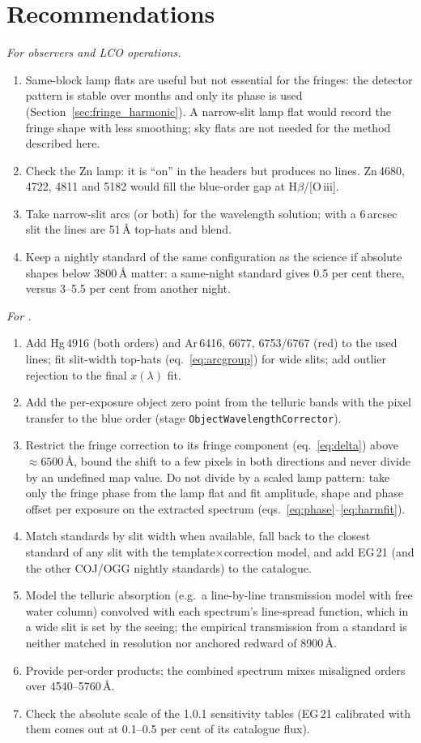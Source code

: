 \section{Recommendations}
\label{sec:recommendations}

\textit{For observers and LCO operations.}
\begin{enumerate}
\item Same-block lamp flats are useful but not essential for the fringes: the detector pattern is stable over months
and only its phase is used (Section~\ref{sec:fringe_harmonic}). A narrow-slit lamp flat would record the fringe
shape with less smoothing; sky flats are not needed for the method described here.
\item Check the Zn lamp: it is ``on'' in the headers but produces no lines. Zn\,4680, 4722, 4811 and 5182 would fill
the blue-order gap at H$\beta$/[O\,{\sc iii}].
\item Take narrow-slit arcs (or both) for the wavelength solution; with a 6\,arcsec slit the lines are 51\,\AA{}
top-hats and blend.
\item Keep a nightly standard of the same configuration as the science if absolute shapes below 3800\,\AA{} matter:
a same-night standard gives 0.5 per cent there, versus 3--5.5 per cent from another night.
\end{enumerate}

\textit{For \banzai.}
\begin{enumerate}
\item Add Hg\,4916 (both orders) and Ar\,6416, 6677, 6753/6767 (red) to the used lines; fit slit-width top-hats
(eq.~\ref{eq:arcgroup}) for wide slits; add outlier rejection to the final $x(\lambda)$ fit.
\item Add the per-exposure object zero point from the telluric bands with the pixel transfer to the blue order
(stage \texttt{ObjectWavelengthCorrector}).
\item Restrict the fringe correction to its fringe component (eq.~\ref{eq:delta}) above $\approx6500$\,\AA, bound the
shift to a few pixels in both directions and never divide by an undefined map value. Do not divide by a scaled
lamp pattern: take only the fringe phase from the lamp flat and fit amplitude, shape and phase offset per exposure
on the extracted spectrum (eqs.~\ref{eq:phase}--\ref{eq:harmfit}).
\item Match standards by slit width when available, fall back to the closest standard of any slit with the
template$\times$correction model, and add EG\,21 (and the other COJ/OGG nightly standards) to the catalogue.
\item Model the telluric absorption (e.g.\ a line-by-line transmission model with free water column) convolved with
each spectrum's line-spread function, which in a wide slit is set by the seeing; the empirical transmission from a
standard is neither matched in resolution nor anchored redward of 8900\,\AA.
\item Provide per-order products; the combined spectrum mixes misaligned orders over 4540--5760\,\AA.
\item Check the absolute scale of the 1.0.1 sensitivity tables (EG\,21 calibrated with them comes out at 0.1--0.5 per cent
of its catalogue flux).
\end{enumerate}
